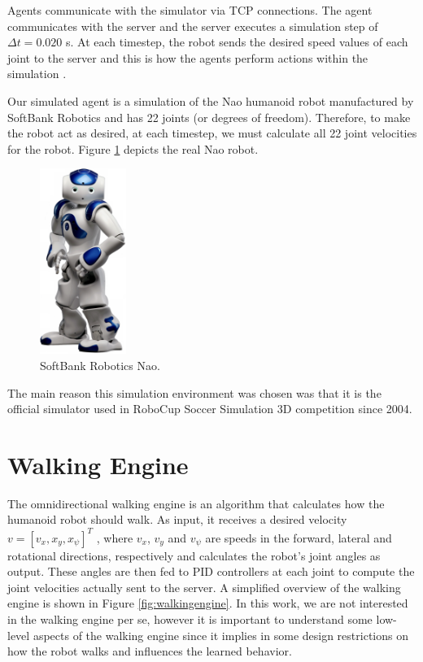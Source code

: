 Agents communicate with the simulator via TCP connections. The agent communicates with the server and the server
executes a simulation step of $\Delta t = 0.020$ s. At each timestep, the robot sends the desired speed values of each joint to the server
and this is how the agents perform actions within the simulation \cite{SimSparkEffectors}.

Our simulated agent is a simulation of the Nao humanoid robot manufactured by SoftBank Robotics \cite{NaoRobot} and has 22 joints (or degrees of freedom).
Therefore, to make the robot act as desired, at each timestep, we must calculate all 22 joint velocities for the robot.
Figure \ref{fig:nao} depicts the real Nao robot.

\begin{figure}[H]
    \centering
    \includegraphics[width=0.25\textwidth]{Chapter5/nao.png}
    \caption{SoftBank Robotics Nao.}
    \label{fig:nao}
\end{figure}

The main reason this simulation environment was chosen was that it is the official simulator used in RoboCup Soccer Simulation 3D competition since 2004.

\section{Walking Engine}

The omnidirectional walking engine is an algorithm that calculates how the humanoid robot should walk. 
As input, it receives a desired velocity $v = [v_x, x_y, x_{\psi}]^T$ , where $v_x$, $v_y$ and $v_{\psi}$
are speeds in the forward, lateral and rotational directions, respectively and calculates the robot's joint angles as output.
These angles are then fed to PID controllers at each joint to compute the joint velocities actually sent to the server.
A simplified overview of the walking engine is shown in Figure \ref{fig:walkingengine}.
In this work, we are not interested in the walking engine per se, however it is important to understand some low-level aspects
of the walking engine since it implies in some design restrictions on how the robot walks and influences the learned behavior.

